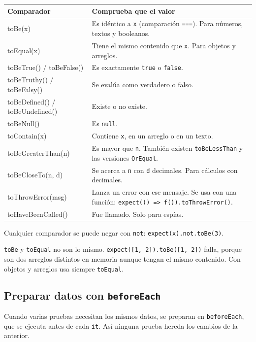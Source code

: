 \documentclass[11pt,a4paper]{article}
\newcommand{\cmd}[1]{\texttt{\color{reactdark}#1}}
\begin{document}
\begin{center}
\small
\begin{tabular}{>{\ttfamily}l p{9.3cm}}
\toprule
\textrm{\textbf{Comparador}} & \textbf{Comprueba que el valor} \\
\midrule
toBe(x) & Es idéntico a \cmd{x} (comparación \cmd{===}). Para números, textos y booleanos. \\
toEqual(x) & Tiene el mismo contenido que \cmd{x}. Para objetos y arreglos. \\
toBeTrue() / toBeFalse() & Es exactamente \cmd{true} o \cmd{false}. \\
toBeTruthy() / toBeFalsy() & Se evalúa como verdadero o falso. \\
toBeDefined() / toBeUndefined() & Existe o no existe. \\
toBeNull() & Es \cmd{null}. \\
toContain(x) & Contiene \cmd{x}, en un arreglo o en un texto. \\
toBeGreaterThan(n) & Es mayor que \cmd{n}. También existen \cmd{toBeLessThan} y las versiones \cmd{OrEqual}. \\
toBeCloseTo(n, d) & Se acerca a \cmd{n} con \cmd{d} decimales. Para cálculos con decimales. \\
toThrowError(msg) & Lanza un error con ese mensaje. Se usa con una función: \cmd{expect(() => f()).toThrowError()}. \\
toHaveBeenCalled() & Fue llamado. Solo para espías. \\
\bottomrule
\end{tabular}
\end{center}

Cualquier comparador se puede negar con \cmd{not}: \cmd{expect(x).not.toBe(3)}.

\begin{atencion}
\cmd{toBe} y \cmd{toEqual} no son lo mismo. \cmd{expect([1, 2]).toBe([1, 2])} falla, porque son dos arreglos distintos en memoria aunque tengan el mismo contenido. Con objetos y arreglos usa siempre \cmd{toEqual}.
\end{atencion}

\subsection{Preparar datos con \texttt{beforeEach}}

Cuando varias pruebas necesitan los mismos datos, se preparan en \cmd{beforeEach}, que se ejecuta antes de cada \cmd{it}. Así ninguna prueba hereda los cambios de la anterior.
\end{document}

